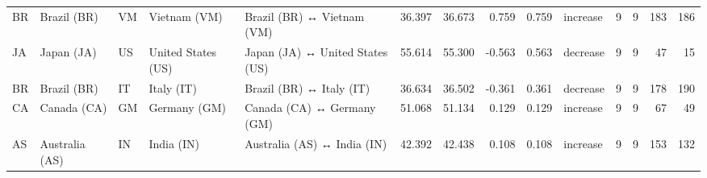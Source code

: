 \begin{tabular}{lllllrrrrlrrrr}
BR & Brazil (BR) & VM & Vietnam (VM) & Brazil (BR) ↔ Vietnam (VM) & 36.397 & 36.673 & 0.759 & 0.759 & increase & 9 & 9 & 183 & 186 \\
JA & Japan (JA) & US & United States (US) & Japan (JA) ↔ United States (US) & 55.614 & 55.300 & -0.563 & 0.563 & decrease & 9 & 9 & 47 & 15 \\
BR & Brazil (BR) & IT & Italy (IT) & Brazil (BR) ↔ Italy (IT) & 36.634 & 36.502 & -0.361 & 0.361 & decrease & 9 & 9 & 178 & 190 \\
CA & Canada (CA) & GM & Germany (GM) & Canada (CA) ↔ Germany (GM) & 51.068 & 51.134 & 0.129 & 0.129 & increase & 9 & 9 & 67 & 49 \\
AS & Australia (AS) & IN & India (IN) & Australia (AS) ↔ India (IN) & 42.392 & 42.438 & 0.108 & 0.108 & increase & 9 & 9 & 153 & 132 \\
\bottomrule
\end{tabular}
